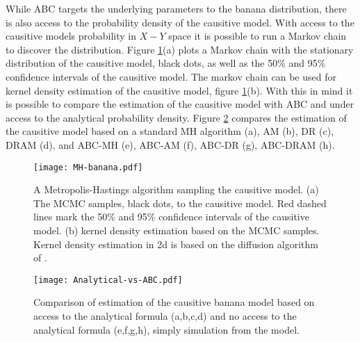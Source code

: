 While ABC targets the underlying parameters to the banana distribution, there is also access to the probability density of the causitive model. With access to the causitive models probability in $X-Y$ space it is possible to run a Markov chain to discover the distribution. Figure \ref{Analytical-banana}(a) plots a Markov chain with the stationary distribution of the causitive model, black dots, as well as the 50\% and 95\% confidence intervals of the causitive model. The markov chain can be used for kernel density estimation of the causitive model, figure \ref{Analytical-banana}(b). With this in mind it is possible to compare the estimation of the causitive model with ABC and under access to the analytical probability density. Figure \ref{the-comparison} compares the estimation of the causitive model based on a standard MH algorithm (a), AM (b), DR (c), DRAM (d), and ABC-MH (e), ABC-AM (f), ABC-DR (g), ABC-DRAM (h). 

\begin{figure}[H]
\centering
\texttt{[image: MH-banana.pdf]}
\caption{A Metropolis-Hastings algorithm sampling the causitive model. (a) The MCMC samples, black dots, to the causitive model. Red dashed lines mark the 50\% and 95\% confidence intervals of the causitive model. (b) kernel density estimation based on the MCMC samples. Kernel density estimation in 2d is based on the diffusion algorithm of \citet{Botev2010}.}
\label{Analytical-banana}
\end{figure}

\begin{figure}[H]
\centering
\texttt{[image: Analytical-vs-ABC.pdf]}
\caption{Comparison of estimation of the causitive banana model based on access to the analytical formula (a,b,c,d) and no access to the analytical formula (e,f,g,h), simply simulation from the model.}
\label{the-comparison}
\end{figure}

